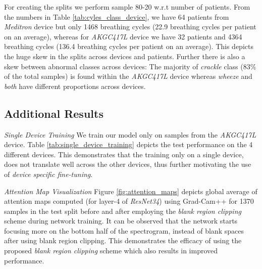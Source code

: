 \documentclass{article}
\begin{document}
For creating the splits we perform sample 80-20 w.r.t number of patients. From the numbers in Table \ref{tab:cyles_class_device}, we have 64 patients from \textit{Meditron} device but only 1468 breathing cycles (22.9 breathing cycles per patient on an average), whereas for \textit{AKGC417L} device we have 32 patients and 4364 breathing cycles (136.4 breathing cycles per patient on an average). This depicts the huge skew in the splits across devices and patients. Further there is also a skew between abnormal classes across devices: The majority of \textit{crackle} class (83\% of the total samples) is found within the \textit{AKGC417L} device whereas \textit{wheeze} and \textit{both} have different proportions across devices. 

\subsection{Additional Results}

\smallskip \textit{Single Device Training} We train our model only on samples from the \textit{AKGC417L} device. Table \ref{tab:single_device_training} depicts the test performance on the 4 different devices. This demonstrates that the training only on a single device, does not translate well across the other devices, thus further motivating the use of \textit{device specific fine-tuning}.

\begin{table}[!htbp]
    \centering
    \small
    \vspace{-2mm}
    \caption{\textit{Scores device wise for each class when trained only on AKGC417L. Overall \textbf{Score:} 53.0\%, \textbf{Sensitivity:} 55.7\% and \textbf{Specificity:} 50.3\%.}}
    \label{tab:single_device_training}
\end{table} 
\smallskip \textit{Attention Map Visualization} Figure \ref{fig:attention_maps} depicts  global average of attention maps computed (for layer-4 of \textit{ResNet34}) using Grad-Cam++\cite{gradcampp} for 1370 samples in the test split before and after employing the \textit{blank region clipping} scheme during network training. It can be observed that the network starts focusing more on the bottom half of the spectrogram, instead of blank spaces after using blank region clipping. This demonstrates the efficacy of using the proposed \textit{blank region clipping} scheme which also results in improved performance.
\end{document}
